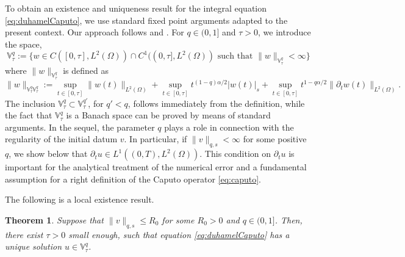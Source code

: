\documentclass{amsart}
\newcommand{\ele}{L^2(\Omega)}
\newcommand{\V}{\mathbb{V}^q}
\newtheorem{theorem}{Theorem}[section]
\theoremstyle{remark}
\theoremstyle{definition}
\numberwithin{equation}{section}
\begin{document}
To obtain an existence and uniqueness result for the integral equation \eqref{eq:duhamelCaputo}, we use standard fixed point arguments adapted to the present context. Our approach follows \cite{larsson} and \cite{tesisneto}. For $q \in (0,1]$ and $\tau>0$, we introduce the space,
$$\V_{\tau} := \{ w \in C([0,\tau],\ele) \cap C^1((0,\tau],\ele) \text{ such that } \|w\|_{\V_{\tau}}<\infty\}$$
where $\|w\|_{\V_{\tau}}$ is defined as 
$$\|w\|_{\V_{\tau}\V_{\tau}} := \sup_{t \in [0,\tau]} \|w(t)\|_{\ele} + \sup_{t \in [0,\tau]} t^{(1-q)\alpha/2}|w(t)|_{s} +  \sup_{t \in [0,\tau]}t^{1-q\alpha/2}\|\partial_t w(t)\|_{\ele}.$$ 
The inclusion $\V_{\tau} \subset \mathbb{V}_{\tau}^{q'}$, for $q'<q$, follows  immediately from the definition, while the fact that $\V_{\tau}$ is a Banach space can be proved by means of standard arguments.  In the sequel, the parameter $q$ plays a role in connection with the regularity of the initial datum $v$. In particular, if $\|v\|_{q,s} < \infty$ for some positive $q$, we show  below that  $ \partial_t u \in L^{1}((0,T),\ele)$. This condition on $\partial_t u$ is important for the analytical treatment of the numerical error and a fundamental assumption for a right  definition of the Caputo operator \eqref{eq:caputo}.

The following is  a local existence result. 

  
\begin{theorem}
\label{EUlocal}
Suppose that $\|v\|_{q,s} \leq R_0$ for some $R_0 > 0$ and $q \in (0,1]$. Then, there exist $\tau>0$ small enough, such that equation \eqref{eq:duhamelCaputo} has a unique solution $u \in \V_{\tau}$. 
\end{theorem}
\end{document}

